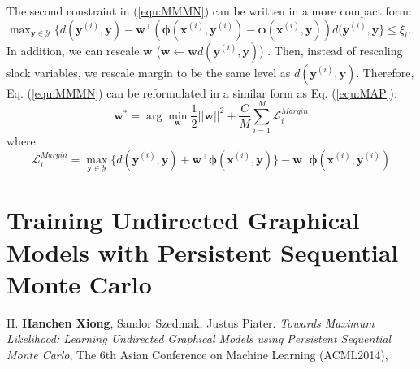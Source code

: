 The second constraint in (\ref{equ:MMMN}) can be written in a more compact form: 
$\max_{\mathbf{y}\in\mathcal{Y}} \{d(\mathbf{y}^{(i)},\mathbf{y})-{\mathbf{w}^\top} (\boldsymbol{\phi}(\mathbf{x}^{(i)},\mathbf{y}^{(i)})-\boldsymbol{\phi} 
        (\mathbf{x}^{(i)},\mathbf{y})) d(\mathbf{y}^{(i)},\mathbf{y}\}\leq \xi_i$. 
In addition, we can rescale $\mathbf{w}$ ($\mathbf{w}\gets \mathbf{w}d(\mathbf{y}^{(i)},\mathbf{y})$)
. Then, instead of rescaling slack variables, we rescale margin to be the same level as 
$d(\mathbf{y}^{(i)},\mathbf{y})$.  
Therefore, Eq. (\ref{equ:MMMN}) can be reformulated in a similar form as Eq. (\ref{equ:MAP}):
\begin{equation}
        \mathbf{w}^* = \arg\min_{\mathbf{w}} \frac{1}{2} ||\mathbf{w}||^2+ \frac{C}{M}\sum_{i=1}^M \mathcal{L}^{Margin}_i 
    \label{equ:MMMN_compact}
\end{equation}
where 
\begin{equation} 
    \mathcal{L}^{Margin}_i=\max_{\mathbf{y}\in\mathcal{Y}} \{d(\mathbf{y}^{(i)},\mathbf{y})+ \mathbf{w}^\top\boldsymbol{\phi} 
        (\mathbf{x}^{(i)},\mathbf{y})\} -\mathbf{w}^\top\boldsymbol{\phi}(\mathbf{x}^{(i)},\mathbf{y}^{(i)})
\label{equ:MMMN_loss}
\end{equation}





\section{Training Undirected Graphical Models with Persistent Sequential Monte Carlo}

\begin{shaded}
{\Huge II.} \textbf{Hanchen Xiong}, Sandor Szedmak, Justus Piater. {\it Towards Maximum Likelihood: Learning Undirected Graphical Models using Persistent Sequential Monte Carlo}, The 6th Asian Conference on Machine Learning (ACML2014), 
\end{shaded}


